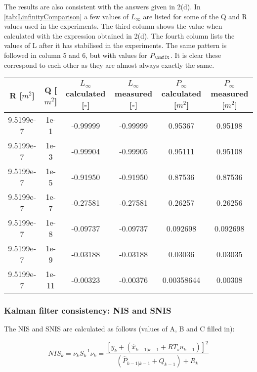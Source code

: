 \documentclass[a4paper]{article}
\newcommand{\newpar}{\vspace{.3cm}\noindent}
\begin{document}
\newpar
The results are also consistent with the answers given in 2(d).
In \autoref{tab:LinfinityComparison} a few values of \(L_\infty\) are listed for some of the Q and R values used in the experiments. The third column shows the value when calculated with the expression obtained in 2(d). The fourth column lists the values of L after it has stabilised in the experiments. The same pattern is followed in column 5 and 6, but with values for \(P_\infIt\). It is clear these correspond to each other as they are almost always exactly the same.

\begin{center}
    \begin{tabular}{ |c|c|c|c|c|c|}
    \hline
    R [\(m^2\)] & Q [\(m^2\)] & \(L_\infty\) calculated [-] & \(L_\infty\) measured [-] & \(P_\infty\) calculated [\(m^2\)] & \(P_\infty\) measured [\(m^2\)] \\
    \hline
    9.5199e-7        & 1e-1     & -0.99999      &   -0.99999 & 0.95367 & 0.95198          \\
    \hline
    9.5199e-7        & 1e-3     & -0.99904      &  -0.99905 & 0.95111 & 0.95108               \\
    \hline
    9.5199e-7        & 1e-5     & -0.91950      &  -0.91950 & 0.87536 & 0.87536          \\
    \hline
    9.5199e-7        & 1e-7     & -0.27581      & -0.27581 & 0.26257 & 0.26256          \\ 
    \hline
    9.5199e-7        & 1e-8     & -0.09737      & -0.09737 & 0.092698 & 0.092698         \\ 
    \hline
    9.5199e-7        & 1e-9     & -0.03188      & -0.03188 & 0.03036 & 0.03035         \\ 
    \hline
    9.5199e-7        & 1e-11    & -0.00323      & -0.00376 & 0.00358644 & 0.00308          \\ 
    \hline
    \end{tabular}  
    \label{tab:LinfinityComparison}
\end{center}


\subsubsection{Kalman filter consistency: NIS and SNIS}

The NIS and SNIS are calculated as follows (values of A, B and C filled in):

\begin{equation}
    NIS_{k}=\nu_{k} S_{k}^{-1} \nu_{k} = \frac{\left[y_{k}+\left( \hat{x}_{k-1|k-1}+R T_{s} u_{k-1}\right)\right]^{2}}{\left( \hat{P}_{k-1|k-1}+Q_{k-1}\right)+R_{k}}
    \label{eq:nis}
\end{equation}
\end{document}
